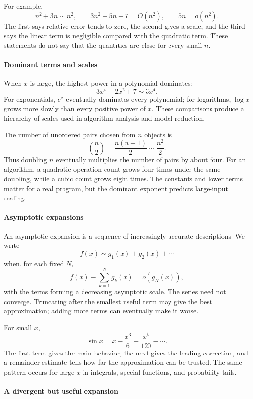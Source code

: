 For example,
\[
 n^2+3n\sim n^2,\qquad 3n^2+5n+7=O(n^2),\qquad
 5n=o(n^2).
\]
The first says relative error tends to zero, the second gives a scale, and the third says the linear term is negligible compared with the quadratic term. These statements do not say that the quantities are close for every small $n$.

\paragraph{Dominant terms and scales}

When $x$ is large, the highest power in a polynomial dominates:
\[
 3x^4-2x^2+7\sim3x^4.
\]
For exponentials, $e^x$ eventually dominates every polynomial; for logarithms, $\log x$ grows more slowly than every positive power of $x$. These comparisons produce a hierarchy of scales used in algorithm analysis and model reduction.

The number of unordered pairs chosen from $n$ objects is
\[
 \binom{n}{2}=\frac{n(n-1)}2\sim\frac{n^2}{2}.
\]
Thus doubling $n$ eventually multiplies the number of pairs by about four. For an algorithm, a quadratic operation count grows four times under the same doubling, while a cubic count grows eight times. The constants and lower terms matter for a real program, but the dominant exponent predicts large-input scaling.

\paragraph{Asymptotic expansions}

An asymptotic expansion is a sequence of increasingly accurate descriptions. We write
\[
 f(x)\sim g_1(x)+g_2(x)+\cdots
\]
when, for each fixed $N$,
\[
 f(x)-\sum_{k=1}^{N}g_k(x)=o(g_N(x)),
\]
with the terms forming a decreasing asymptotic scale. The series need not converge. Truncating after the smallest useful term may give the best approximation; adding more terms can eventually make it worse.

For small $x$,
\[
 \sin x=x-\frac{x^3}{6}+\frac{x^5}{120}-\cdots.
\]
The first term gives the main behavior, the next gives the leading correction, and a remainder estimate tells how far the approximation can be trusted. The same pattern occurs for large $x$ in integrals, special functions, and probability tails.

\paragraph{A divergent but useful expansion}

